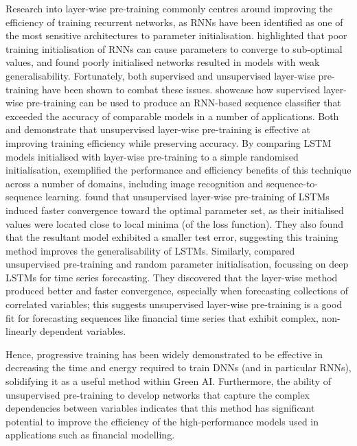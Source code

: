 \documentclass[a4paper, 11pt]{report}
\begin{document}
    Research into layer-wise pre-training commonly centres around improving the efficiency of training recurrent networks, as RNNs have been identified as one of the most sensitive architectures to parameter initialisation. \citet{xu-2018} highlighted that poor training initialisation of RNNs can cause parameters to converge to sub-optimal values, and \citet{ienco-2019} found poorly initialised networks resulted in models with weak generalisability. Fortunately, both supervised and unsupervised layer-wise pre-training have been shown to combat these issues. \citet{ienco-2019} showcase how supervised layer-wise pre-training can be used to produce an RNN-based sequence classifier that exceeded the accuracy of comparable models in a number of applications. Both \citet{xu-2018} and \citet{sagheer-2019} demonstrate that unsupervised layer-wise pre-training is effective at improving training efficiency while preserving accuracy. By comparing LSTM models initialised with layer-wise pre-training to a simple randomised initialisation, \citet{xu-2018} exemplified the performance and efficiency benefits of this technique across a number of domains, including image recognition and sequence-to-sequence learning. \citet{xu-2018} found that unsupervised layer-wise pre-training of LSTMs induced faster convergence toward the optimal parameter set, as their initialised values were located close to local minima (of the loss function). They also found that the resultant model exhibited a smaller test error, suggesting this training method improves the generalisability of LSTMs. Similarly, \citet{sagheer-2019} compared unsupervised pre-training and random parameter initialisation, focussing on deep LSTMs for time series forecasting. They discovered that the layer-wise method produced better and faster convergence, especially when forecasting collections of correlated variables; this suggests unsupervised layer-wise pre-training is a good fit for forecasting sequences like financial time series that exhibit complex, non-linearly dependent variables.

    Hence, progressive training has been widely demonstrated to be effective in decreasing the time and energy required to train DNNs (and in particular RNNs), solidifying it as a useful method within Green AI. Furthermore, the ability of unsupervised pre-training to develop networks that capture the complex dependencies between variables indicates that this method has significant potential to improve the efficiency of the high-performance models used in applications such as financial modelling.
\end{document}
